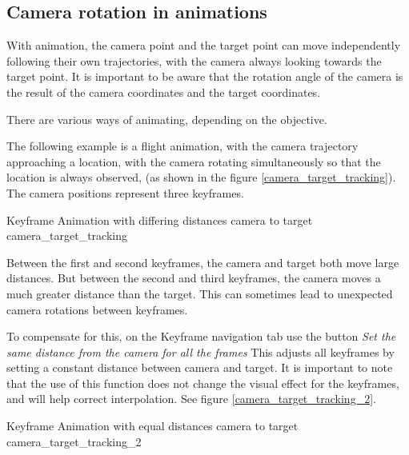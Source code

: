 \subsection{Camera rotation in animations}\label{camera-rotation-in-animations}

With animation, the camera point and the target point can move independently
following their own trajectories, with the camera always looking towards the
target point. It is important to be aware that the rotation angle of the camera
is the result of the camera coordinates and the target coordinates.

There are various ways of animating, depending on the objective.

The following example is a flight animation, with the camera trajectory
approaching a location, with the camera rotating simultaneously so that the
location is always observed, (as shown in the figure \ref{camera_target_tracking}). The camera
positions represent three keyframes.

{Keyframe Animation with differing distances camera to target}
{camera_target_tracking}

Between the first and second keyframes, the camera and target both move large
distances. But between the second and third keyframes, the camera moves a much
greater distance than the target. This can sometimes lead to unexpected camera
rotations between keyframes.

To compensate for this, on the Keyframe navigation tab use the button \emph{Set the
same distance from the camera for all the frames} This adjusts all keyframes by
setting a constant distance between camera and target. It is important to note
that the use of this function does not change the visual effect for the
keyframes, and will help correct interpolation. See figure \ref{camera_target_tracking_2}.

{Keyframe Animation with equal distances camera to target}
{camera_target_tracking_2}